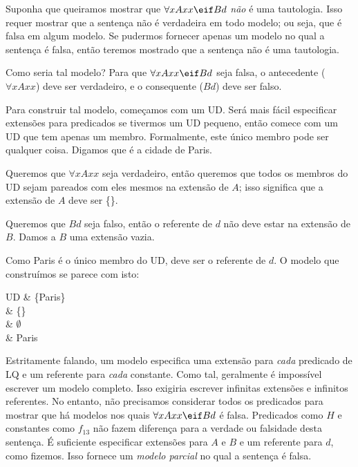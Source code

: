 Suponha que queiramos mostrar que $\forall xAxx \eif Bd$ \emph{não} é uma tautologia. Isso requer mostrar que a sentença não é verdadeira em todo modelo; ou seja, que é falsa em algum modelo. Se pudermos fornecer apenas um modelo no qual a sentença é falsa, então teremos mostrado que a sentença não é uma tautologia.

Como seria tal modelo? Para que $\forall xAxx \eif Bd$ seja falsa, o antecedente ($\forall x Axx$) deve ser verdadeiro, e o consequente ($Bd$) deve ser falso.

Para construir tal modelo, começamos com um UD. Será mais fácil especificar extensões para predicados se tivermos um UD pequeno, então comece com um UD que tem apenas um membro. Formalmente, este único membro pode ser qualquer coisa. Digamos que é a cidade de Paris.

Queremos que $\forall x Axx$ seja verdadeiro, então queremos que todos os membros do UD sejam pareados com eles mesmos na extensão de $A$; isso significa que a extensão de $A$ deve ser \{\}.

Queremos que $Bd$ seja falso, então o referente de $d$ não deve estar na extensão de $B$. Damos a $B$ uma extensão vazia.

Como Paris é o único membro do UD, deve ser o referente de $d$. O modelo que construímos se parece com isto:
\begin{partialmodel}
	UD			& \{Paris\}\\
	 	& \{\}\\
		& $\emptyset$\\
		& Paris
\end{partialmodel}

Estritamente falando, um modelo especifica uma extensão para \emph{cada} predicado de LQ e um referente para \emph{cada} constante. Como tal, geralmente é impossível escrever um modelo completo. Isso exigiria escrever infinitas extensões e infinitos referentes. No entanto, não precisamos considerar todos os predicados para mostrar que há modelos nos quais $\forall xAxx \eif Bd$ é falsa. Predicados como $H$ e constantes como $f_{13}$ não fazem diferença para a verdade ou falsidade desta sentença. É suficiente especificar extensões para $A$ e $B$ e um referente para $d$, como fizemos. Isso fornece um \emph{modelo parcial} no qual a sentença é falsa.

